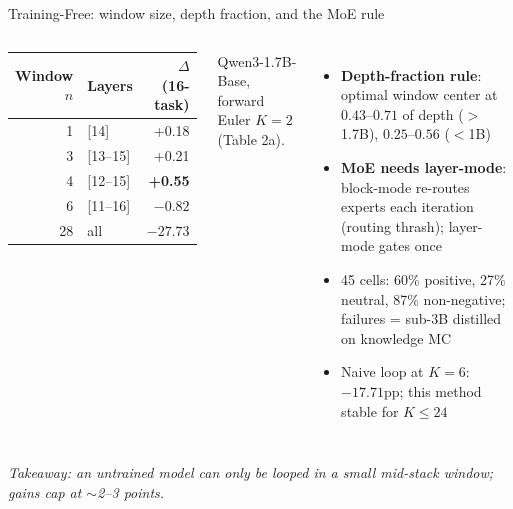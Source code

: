 \documentclass[aspectratio=169,10pt]{beamer}
\newcommand{\con}[1]{\textcolor{negative}{#1}}
\newcommand{\HL}[1]{\textcolor{emphasis}{#1}}
\begin{document}
\begin{frame}{Training-Free: window size, depth fraction, and the MoE rule}
  \begin{columns}[T]
      \vspace{4pt}
      \begin{center}
      \begin{tabular}{@{}rlr@{}}
        \toprule
        Window $n$ & Layers & $\Delta$ (16-task) \\
        \midrule
        1 & [14] & +0.18 \\
        3 & [13--15] & +0.21 \\
        \rowcolor{positive!12} 4 & [12--15] & \textbf{+0.55} \\
        6 & [11--16] & \con{$-0.82$} \\
        28 & all & \con{$-27.73$} \\
        \bottomrule
      \end{tabular}
      \end{center}
      {\small Qwen3-1.7B-Base, forward Euler $K{=}2$ (Table 2a).}
      \begin{itemize}
        \item \textbf{Depth-fraction rule}: optimal window center at $0.43$--$0.71$ of depth ($>$1.7B), $0.25$--$0.56$ ($<$1B)
        \item \textbf{MoE needs layer-mode}: block-mode re-routes experts each iteration (routing thrash); layer-mode gates once
        \item 45 cells: 60\% positive, 27\% neutral, \HL{87\% non-negative}; failures = sub-3B distilled on knowledge MC
        \item Naive loop at $K{=}6$: $-17.71$pp; this method stable for $K \le 24$
      \end{itemize}
  \end{columns}
  \vspace{6pt}
  \textit{Takeaway: an untrained model can only be looped in a small mid-stack window; gains cap at $\sim$2--3 points.}
\end{frame}
\end{document}
